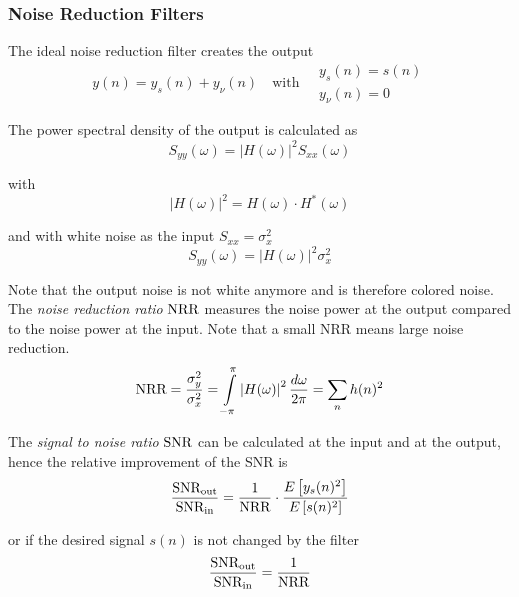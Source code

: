 \subsubsection{Noise Reduction Filters}

The ideal noise reduction filter creates the output
\begin{equation*}
	y(n) = y_s(n) + y_{\nu}(n) \quad \text{with} \quad
		\begin{array}{l}
		y_s(n) = s(n) \\
		y_{\nu}(n) = 0
		\end{array}
\end{equation*}

The power spectral density of the output is calculated as
\begin{equation*}
	S_{yy}(\omega) = \left| H(\omega) \right|^2 S_{xx}(\omega)
\end{equation*}

with
\begin{equation*}
	\left| H(\omega) \right|^2 = H(\omega) \cdot H^*(\omega)
\end{equation*}

and with white noise as the input $S_{xx} = \sigma_x^2$
\begin{equation*}
	S_{yy}(\omega) = \left| H(\omega) \right|^2 \sigma_x^2
\end{equation*}

Note that the output noise is not white anymore and is therefore colored noise. \\

The \emph{noise reduction ratio} $\operatorname{\text{NRR}}$ measures the noise power at the output
compared to the noise power at the input. Note that a small NRR means
large noise reduction.
\begin{equation*}
	\operatorname{\text{NRR}} = \frac{\sigma_y^2}{\sigma_x^2}
		 = \int\limits_{-\pi}^{\pi} \left| H(\omega) \right|^2 \frac{d\omega}{2\pi}
		 = \sum\limits_{n} h(n)^2
\end{equation*}

The \emph{signal to noise ratio} $\operatorname{\text{SNR}}$ can be calculated at the input and
at the output, hence the relative improvement of the SNR is
\begin{equation*}
	\frac{\operatorname{\text{SNR}}_{\text{out}}}{\operatorname{\text{SNR}}_{\text{in}}} = \frac{1}{\operatorname{\text{NRR}}} \cdot \frac{E\left[y_s(n)^2\right]}{E\left[s(n)^2\right]}
\end{equation*}

or if the desired signal $s(n)$ is not changed by the filter
\begin{equation*}
	\frac{\operatorname{\text{SNR}}_{\text{out}}}{\operatorname{\text{SNR}}_{\text{in}}} = \frac{1}{\operatorname{\text{NRR}}}
\end{equation*}

